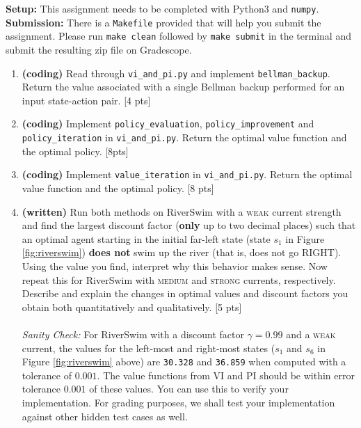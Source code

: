 \documentclass[11pt]{article}
\begin{document}
\noindent \textbf{Setup:} This assignment needs to be completed with Python3 and \texttt{numpy}. 
\\

\noindent \textbf{Submission:} There is a \texttt{Makefile} provided that will help you submit the assignment. Please run \texttt{make clean} followed by \texttt{make submit} in the terminal and submit the resulting zip file on Gradescope.

\begin{enumerate}[label=(\alph*)]
\item \textbf{(coding)} Read through \texttt{vi\_and\_pi.py} and implement \texttt{bellman\_backup}. Return the value associated with a single Bellman backup performed for an input state-action pair. [4 pts]\\


\item \textbf{(coding)} Implement \texttt{policy\_evaluation}, \texttt{policy\_improvement} and \texttt{policy\_iteration} in  \texttt{vi\_and\_pi.py}. Return the optimal value function and the optimal policy. [8pts]\\


\item \textbf{(coding)} Implement \texttt{value\_iteration} in \texttt{vi\_and\_pi.py}. Return the optimal value function and the optimal policy. [8 pts]\\


\item \textbf{(written)} Run both methods on RiverSwim with a \textsc{weak} current strength and find the largest discount factor (\textbf{only} up to two decimal places) such that an optimal agent starting in the initial far-left state (state $s_1$ in Figure \ref{fig:riverswim}) \textbf{does not} swim up the river (that is, does not go \textsc{RIGHT}). Using the value you find, interpret why this behavior makes sense. Now repeat this for RiverSwim with \textsc{medium} and \textsc{strong} currents, respectively. Describe and explain the changes in optimal values and discount factors you obtain both quantitatively and qualitatively. [5 pts]\\ \\
\textit{Sanity Check:} For RiverSwim with a discount factor $\gamma = 0.99$ and a \textsc{weak} current, the values for the left-most and right-most states ($s_1$ and $s_6$ in Figure \ref{fig:riverswim} above) are \texttt{30.328} and \texttt{36.859} when computed with a tolerance of $0.001$. The value functions from VI and PI should be within error tolerance $0.001$ of these values. You can use this to verify your implementation. For grading purposes, we shall test your implementation against other hidden test cases as well.

\end{enumerate}
\end{document}

